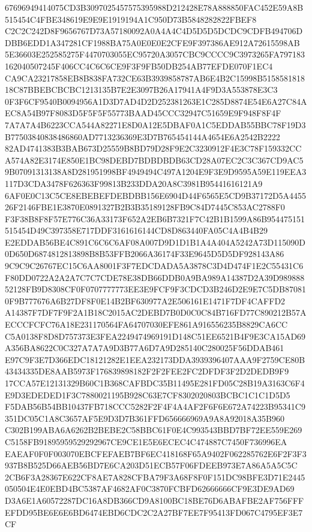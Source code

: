 \documentclass[UTF8,fontset=fandol,zihao=-4,a4paper]{ctexart}
\begin{document}
{{67696949414075CD3B3097025457575395988D212428E78A888850FAC452E59A8B515454C4FBE348619E9E9E1919194A1C950D73B5848282822FBEF8
C2C2C242D8F9656767D73A57180092A0A4A4C4D5D5D5DCDC9CDFB494706DDBB6EDD1A347281CF1988BA75A0E0E0E2CFE9F397386AE912A72615598AB
5E36603E252585275F4470703055EC95720A3057CBC9CCCC9C3973265FA797183162040507245F406CC4C6C6CE9F3F9FB50DB254AB77EFDE070F1EC4
CA9CA23217858EB8B838FA732CE63B3939858787AB6E4B2C15998B515858181818C87BBEBCBCBC1213135B7E2E3097B26A17941A4F9D3A553878E3C3
0F3F6CF9540B0094956A1D3D7AD4D2D252381263E1C285D8874E54E6A27C84AEC8A54B97F8083D5F5F5F55773BAAD45CCC32947C51659E9F948F8F4F
7A7A7A4B6223CCA544A82271E8D0A12E5DBAF0A1C5EDDAB55BBC78F19D3B77503840838486860AD7713236369E3D7B765454144A4654E6A2542B2222
82AD4741383B3BAB673D25559B8BD79D28F9E2C3230912F4E3C78F159332CCA574A82E3174E850E1BC98DEBD7BDBDBDB63CD28A07EC2C3C367CD9AC5
9B07091313138A8D281951998BF4949494C497A1204E9F3E9D9595A59E119EEA3117D3CDA3478F626363F99813B233DDA20A8C3981B95441616121A9
6AF0E0C13C5CE8EBEBEFDEBDBB156E6904D44F6565E5CD9B37172D5A445526F2146FBE1E3870E0891327B2B3B35189128FB9C84D7445C853AC2788F0
F3F38B8F8F57E776C36A33173F652A2EB6B7321F7C42B1B1599A86B954475151515454D49C397358E717DDF3161616144CD8D863440FA05C4A4B4B29
E2EDDAB56BE4C891C6C6C6AF08A007D9D1D1B1A4A404A5242A73D115090D0D650D6874812813898B8B53FFB2066A36174F33E9645D5D5DF928143A86
9C9C9C26767EC15C6AA8001F3F7EDCDADA5A3878C3D4D474F1E2C55431C6F80DD0722A2A2A7C7C7CDE78E38DB66DDB0A9BA989A14387D2A39D989888
52128FB9D8308CF0F0707777773EE3E9FCF9F3CDCD3B246D2E9E7C5DB870810F9B777676A6B27DF8F0E14B2BF630977A2E506161E1471F7DF4CAFFD2
A14387F7DF7F9F2A1B18C2015AC2DEBD7B0D0C0C84B716FD77C890212B57AECCCFCFC76A18E231170564FA64707030EFE861A916556235B8829CA6CC
C5A0138F8D8D757373E3FEA2249474969191D148C51EE6521B4F9E3CA15AD69A356BA8622C0C327A7A7A9D3B77A6D7A9D285140C280025F56DDAB461
E97C9F3E7D366EDC18121282E1EEA232173DDA3939396407AAA9F2759CE80B43434335DE8AAB5973F176839898182F2F2FEE2FC2DFDF3F2D2DEDB9F9
17CCA57E12131329B60C1B368CAFBDC35B11495E281FD05C28B19A3163C6F4E9D3EDEDED1F3C7880021195B928C63E7CF8302020803BCBC1C1C1D5D5
F5DAB56B54BB10437FB718CCC5282F2F4F4A4AF2F6F6E672A74223B95341C9351DC05C1A8C3657AF5E9D3D7B361FFD656666969A9A8A92018A35B960
C302B199ABA6A6262B2BEBE2C58BBC61F0E4C993543BBD7BF72EE559E269C5158FB91895959529292967CE9CE1E5E6ECEC4C474887C7450F736996EA
EAEAF0F0F003070EBCFEFAEB7BF6EC418168F65A9402F062285762E6F2F3F3937B8B525D66AEB56BD7E6CA203D51ECB57F06FDEEB973E7A86A5A5C5C
2CB6F3A28367E622CF8AE7A828CFBA79F3A68F8F0F151DC98BFE3D71E2445050504E4E0EBD4BC5387AF4682AF0C3870FCBFD62666666CF9E3DE9AD69
D3A6E1A60572287DC16A8DB366CD9A8100BC18BE76D6ABAFBE2AF756FFFEFDD95BE6E6E6BD6474EBD6CDC2C2A27BF7EE7F95413FD067C4795EF3E7CF
}}
\end{document}

